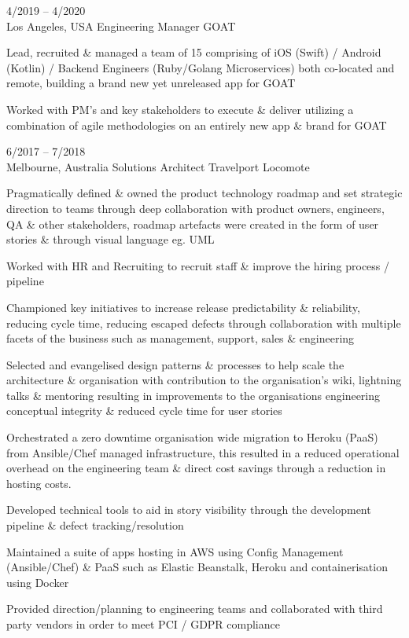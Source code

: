 \documentclass[9pt]{developercv} %
\begin{document}
\begin{entrylist}
	\entry
    {4/2019 -- 4/2020\\\footnotesize{Los Angeles, USA}}
		{Engineering Manager}
		{GOAT}
    {Lead, recruited \& managed a team of 15 comprising of iOS (Swift) / Android
    (Kotlin) / Backend Engineers (Ruby/Golang Microservices)  both co-located
    and remote, building a brand new yet unreleased app for GOAT
    \par\medskip Worked with PM’s and key stakeholders to execute \& deliver utilizing a
    combination of agile methodologies on an entirely new app \& brand for GOAT}
	\entry
		{6/2017 -- 7/2018\\\footnotesize{Melbourne, Australia}}
		{Solutions Architect}
		{Travelport Locomote}
    {
    Pragmatically defined \& owned the product technology roadmap and set strategic direction to teams through deep collaboration with product owners, engineers, QA \& other stakeholders, roadmap artefacts were created in the form of user stories \& through visual language eg. UML
    \par\medskip Worked with HR and Recruiting to recruit staff \& improve the hiring process / pipeline
    \par\medskip Championed key initiatives to increase release predictability \& reliability, reducing cycle time, reducing escaped defects through
    collaboration with multiple facets of the business such as management, support, sales \& engineering
\par\medskip Selected and evangelised design patterns \& processes to help scale the architecture \& organisation with contribution to the organisation's wiki, lightning talks \& mentoring resulting in improvements to the organisations engineering conceptual integrity \& reduced cycle time for user stories
\par\medskip Orchestrated a zero downtime organisation wide migration to Heroku (PaaS) from Ansible/Chef managed infrastructure, this resulted in a reduced operational overhead on the engineering team \& direct cost savings through a reduction in hosting costs.
\par\medskip Developed technical tools to aid in story visibility through the
    development pipeline \& defect tracking/resolution 
\par\medskip Maintained a suite of apps hosting in AWS using Config Management
    (Ansible/Chef) \& PaaS such as Elastic Beanstalk, Heroku and containerisation using Docker
\par\medskip Provided direction/planning to engineering teams and collaborated with third party vendors in order to meet PCI / GDPR compliance
}
\end{entrylist}
\end{document}
